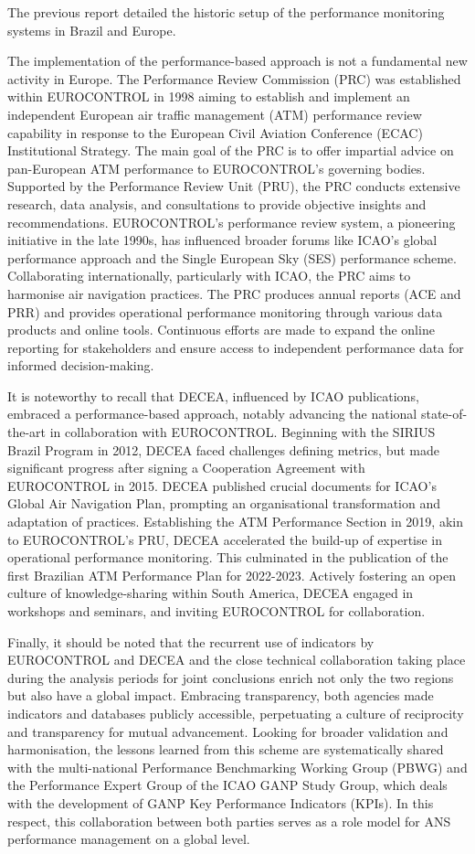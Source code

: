 \documentclass[
  a4paper,
  DIV=11,
  numbers=noendperiod]{scrreport}
\begin{document}
The previous report detailed the historic setup of the performance
monitoring systems in Brazil and Europe.

The implementation of the performance-based approach is not a
fundamental new activity in Europe. The Performance Review Commission
(PRC) was established within EUROCONTROL in 1998 aiming to establish and
implement an independent European air traffic management (ATM)
performance review capability in response to the European Civil Aviation
Conference (ECAC) Institutional Strategy. The main goal of the PRC is to
offer impartial advice on pan-European ATM performance to EUROCONTROL's
governing bodies. Supported by the Performance Review Unit (PRU), the
PRC conducts extensive research, data analysis, and consultations to
provide objective insights and recommendations. EUROCONTROL's
performance review system, a pioneering initiative in the late 1990s,
has influenced broader forums like ICAO's global performance approach
and the Single European Sky (SES) performance scheme. Collaborating
internationally, particularly with ICAO, the PRC aims to harmonise air
navigation practices. The PRC produces annual reports (ACE and PRR) and
provides operational performance monitoring through various data
products and online tools. Continuous efforts are made to expand the
online reporting for stakeholders and ensure access to independent
performance data for informed decision-making.

It is noteworthy to recall that DECEA, influenced by ICAO publications,
embraced a performance-based approach, notably advancing the national
state-of-the-art in collaboration with EUROCONTROL. Beginning with the
SIRIUS Brazil Program in 2012, DECEA faced challenges defining metrics,
but made significant progress after signing a Cooperation Agreement with
EUROCONTROL in 2015. DECEA published crucial documents for ICAO's Global
Air Navigation Plan, prompting an organisational transformation and
adaptation of practices. Establishing the ATM Performance Section in
2019, akin to EUROCONTROL's PRU, DECEA accelerated the build-up of
expertise in operational performance monitoring. This culminated in the
publication of the first Brazilian ATM Performance Plan for 2022-2023.
Actively fostering an open culture of knowledge-sharing within South
America, DECEA engaged in workshops and seminars, and inviting
EUROCONTROL for collaboration.

Finally, it should be noted that the recurrent use of indicators by
EUROCONTROL and DECEA and the close technical collaboration taking place
during the analysis periods for joint conclusions enrich not only the
two regions but also have a global impact. Embracing transparency, both
agencies made indicators and databases publicly accessible, perpetuating
a culture of reciprocity and transparency for mutual advancement.
Looking for broader validation and harmonisation, the lessons learned
from this scheme are systematically shared with the multi-national
Performance Benchmarking Working Group (PBWG) and the Performance Expert
Group of the ICAO GANP Study Group, which deals with the development of
GANP Key Performance Indicators (KPIs). In this respect, this
collaboration between both parties serves as a role model for ANS
performance management on a global level.
\end{document}
